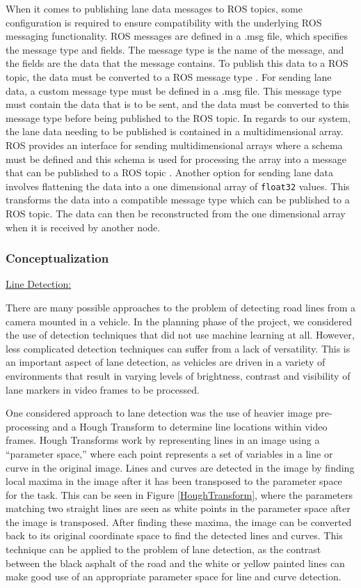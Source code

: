 \documentclass[titlepage,draft]{article}
\begin{document}
When it comes to publishing lane data messages to ROS topics, some configuration is required to ensure compatibility with the underlying ROS messaging functionality. ROS messages are defined in a .msg file, which specifies the message type and fields. The message type is the name of the message, and the fields are the data that the message contains. To publish this data to a ROS topic, the data must be converted to a ROS message type \cite{ros_documentation}. For sending lane data, a custom message type must be defined in a .msg file. This message type must contain the data that is to be sent, and the data must be converted to this message type before being published to the ROS topic. In regards to our system, the lane data needing to be published is contained in a multidimensional array. ROS provides an interface for sending multidimensional arrays where a schema must be defined and this schema is used for processing the array into a message that can be published to a ROS topic \cite{ros_multi_array}. Another option for sending lane data involves flattening the data into a one dimensional array of \texttt{float32} values. This transforms the data into a compatible message type which can be published to a ROS topic. The data can then be reconstructed from the one dimensional array when it is received by another node. 


\subsubsection{Conceptualization}
\label{DetConcept}

\underline{Line Detection:}

There are many possible approaches to the problem of detecting road lines from a camera mounted in a vehicle.
In the planning phase of the project, we considered the use of detection techniques that did not use machine learning at all.
However, less complicated detection techniques can suffer from a lack of versatility.
This is an important aspect of lane detection, as vehicles are driven in a variety of environments that result in varying
levels of brightness, contrast and visibility of lane markers in video frames to be processed.

One considered approach to lane detection was the use of heavier image pre-processing and a Hough Transform to determine line
locations within video frames.
Hough Transforms work by representing lines in an image using a ``parameter space,'' where each point represents a set of
variables in a line or curve in the original image.
Lines and curves are detected in the image by finding local maxima in the image after it has been transposed to the parameter space
for the task.
This can be seen in Figure \ref{HoughTransform}, where the parameters matching two straight lines are seen as white points in
the parameter space after the image is transposed.
After finding these maxima, the image can be converted back to its original coordinate space to find the detected lines and
curves.
This technique can be applied to the problem of lane detection, as the contrast between the black asphalt of the road and the
white or yellow painted lines can make good use of an appropriate parameter space for line and curve detection.
\end{document}

